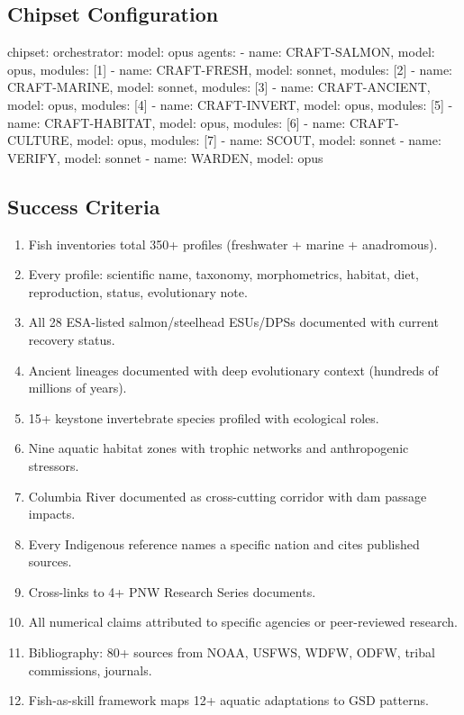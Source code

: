 \documentclass[11pt,letterpaper]{article}
\begin{document}
\subsection{Chipset Configuration}

\begin{asciibox}
chipset:
  orchestrator: { model: opus }
  agents:
    - { name: CRAFT-SALMON, model: opus, modules: [1] }
    - { name: CRAFT-FRESH, model: sonnet, modules: [2] }
    - { name: CRAFT-MARINE, model: sonnet, modules: [3] }
    - { name: CRAFT-ANCIENT, model: opus, modules: [4] }
    - { name: CRAFT-INVERT, model: opus, modules: [5] }
    - { name: CRAFT-HABITAT, model: opus, modules: [6] }
    - { name: CRAFT-CULTURE, model: opus, modules: [7] }
    - { name: SCOUT, model: sonnet }
    - { name: VERIFY, model: sonnet }
    - { name: WARDEN, model: opus }
\end{asciibox}

\subsection{Success Criteria}

\begin{enumerate}[leftmargin=2em]
\item Fish inventories total 350+ profiles (freshwater + marine + anadromous).
\item Every profile: scientific name, taxonomy, morphometrics, habitat, diet, reproduction, status, evolutionary note.
\item All 28 ESA-listed salmon/steelhead ESUs/DPSs documented with current recovery status.
\item Ancient lineages documented with deep evolutionary context (hundreds of millions of years).
\item 15+ keystone invertebrate species profiled with ecological roles.
\item Nine aquatic habitat zones with trophic networks and anthropogenic stressors.
\item Columbia River documented as cross-cutting corridor with dam passage impacts.
\item Every Indigenous reference names a specific nation and cites published sources.
\item Cross-links to 4+ PNW Research Series documents.
\item All numerical claims attributed to specific agencies or peer-reviewed research.
\item Bibliography: 80+ sources from NOAA, USFWS, WDFW, ODFW, tribal commissions, journals.
\item Fish-as-skill framework maps 12+ aquatic adaptations to GSD patterns.
\end{enumerate}
\end{document}
